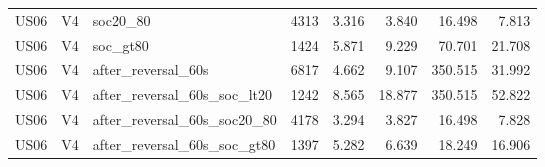 \begin{tabular}{lllrrrrr}
US06 & V4 & soc20\_80 & 4313 & 3.316 & 3.840 & 16.498 & 7.813 \\
US06 & V4 & soc\_gt80 & 1424 & 5.871 & 9.229 & 70.701 & 21.708 \\
US06 & V4 & after\_reversal\_60s & 6817 & 4.662 & 9.107 & 350.515 & 31.992 \\
US06 & V4 & after\_reversal\_60s\_soc\_lt20 & 1242 & 8.565 & 18.877 & 350.515 & 52.822 \\
US06 & V4 & after\_reversal\_60s\_soc20\_80 & 4178 & 3.294 & 3.827 & 16.498 & 7.828 \\
US06 & V4 & after\_reversal\_60s\_soc\_gt80 & 1397 & 5.282 & 6.639 & 18.249 & 16.906 \\
\hline
\end{tabular}
